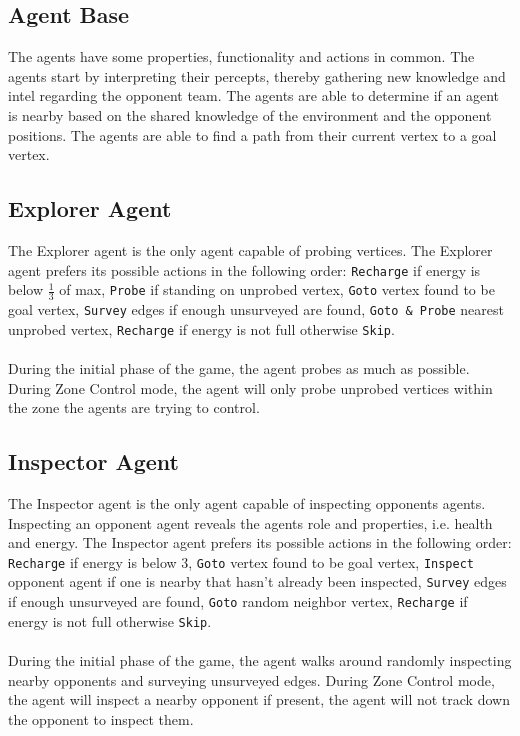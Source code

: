 \documentclass[11pt]{article}
\begin{document}
\subsection{Agent Base}
The agents have some properties, functionality and actions in common. The agents start by interpreting their percepts, thereby gathering new knowledge and intel regarding the opponent team. The agents are able to determine if an agent is nearby based on the shared knowledge of the environment and the opponent positions. The agents are able to find a path from their current vertex to a goal vertex.

\subsection{Explorer Agent}
The Explorer agent is the only agent capable of probing vertices. The Explorer agent prefers its possible actions in the following order: {\tt Recharge} if energy is below $\frac{1}{3}$ of max, {\tt Probe} if standing on unprobed vertex, {\tt Goto} vertex found to be goal vertex, {\tt Survey} edges if enough unsurveyed are found, {\tt Goto \& Probe} nearest unprobed vertex, {\tt Recharge} if energy is not full otherwise {\tt Skip}.\\
\\
During the initial phase of the game, the agent probes as much as possible. During Zone Control mode, the agent will only probe unprobed vertices within the zone the agents are trying to control.

\subsection{Inspector Agent}
The Inspector agent is the only agent capable of inspecting opponents agents. Inspecting an opponent agent reveals the agents role and properties, i.e. health and energy. The Inspector agent prefers its possible actions in the following order: {\tt Recharge} if energy is below 3, {\tt Goto} vertex found to be goal vertex, {\tt Inspect} opponent agent if one is nearby that hasn't already been inspected, {\tt Survey} edges if enough unsurveyed are found, {\tt Goto} random neighbor vertex, {\tt Recharge} if energy is not full otherwise {\tt Skip}.\\
\\
During the initial phase of the game, the agent walks around randomly inspecting nearby opponents and surveying unsurveyed edges. During Zone Control mode, the agent will inspect a nearby opponent if present, the agent will not track down the opponent to inspect them.
\end{document}
